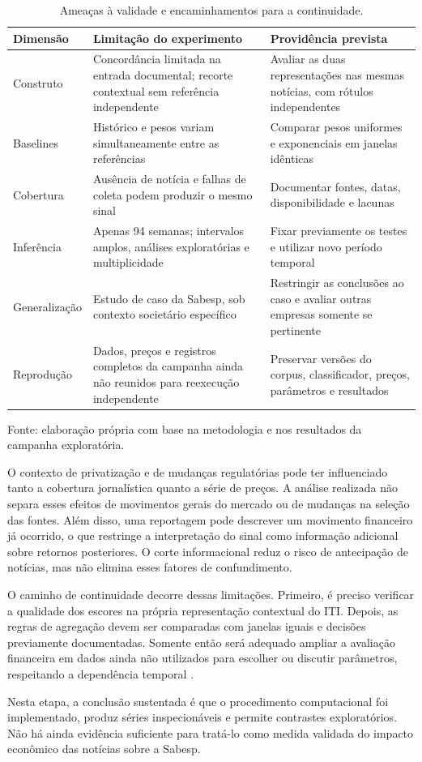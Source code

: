 \begin{table}[!htbp]
\centering
\caption{Ameaças à validade e encaminhamentos para a continuidade.}
\label{tab:ameacas}
\begin{tabularx}{\textwidth}{@{}P{0.20\textwidth}L L@{}}
\toprule
Dimensão & Limitação do experimento & Providência prevista \\
\midrule
Construto & Concordância limitada na entrada documental; recorte contextual sem referência independente & Avaliar as duas representações nas mesmas notícias, com rótulos independentes \\
Baselines & Histórico e pesos variam simultaneamente entre as referências & Comparar pesos uniformes e exponenciais em janelas idênticas \\
Cobertura & Ausência de notícia e falhas de coleta podem produzir o mesmo sinal & Documentar fontes, datas, disponibilidade e lacunas \\
Inferência & Apenas 94 semanas; intervalos amplos, análises exploratórias e multiplicidade & Fixar previamente os testes e utilizar novo período temporal \\
Generalização & Estudo de caso da Sabesp, sob contexto societário específico & Restringir as conclusões ao caso e avaliar outras empresas somente se pertinente \\
Reprodução & Dados, preços e registros completos da campanha ainda não reunidos para reexecução independente & Preservar versões do corpus, classificador, preços, parâmetros e resultados \\
\bottomrule
\end{tabularx}
\par\smallskip
{\footnotesize Fonte: elaboração própria com base na metodologia e nos resultados da campanha exploratória.}
\end{table}

O contexto de privatização e de mudanças regulatórias pode ter influenciado tanto a cobertura jornalística quanto a série de preços. A análise realizada não separa esses efeitos de movimentos gerais do mercado ou de mudanças na seleção das fontes. Além disso, uma reportagem pode descrever um movimento financeiro já ocorrido, o que restringe a interpretação do sinal como informação adicional sobre retornos posteriores. O corte informacional reduz o risco de antecipação de notícias, mas não elimina esses fatores de confundimento.

O caminho de continuidade decorre dessas limitações. Primeiro, é preciso verificar a qualidade dos escores na própria representação contextual do ITI. Depois, as regras de agregação devem ser comparadas com janelas iguais e decisões previamente documentadas. Somente então será adequado ampliar a avaliação financeira em dados ainda não utilizados para escolher ou discutir parâmetros, respeitando a dependência temporal \cite{varma2006bias,roberts2017cross}.

Nesta etapa, a conclusão sustentada é que o procedimento computacional foi implementado, produz séries inspecionáveis e permite contrastes exploratórios. Não há ainda evidência suficiente para tratá-lo como medida validada do impacto econômico das notícias sobre a Sabesp.
